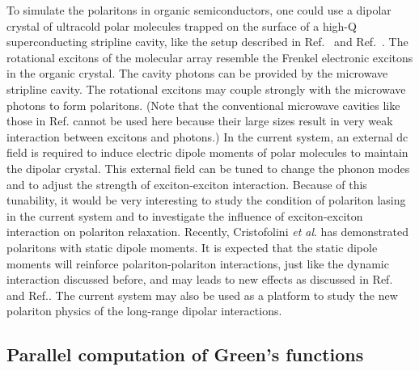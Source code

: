 To simulate the polaritons in organic semiconductors, one could use a dipolar crystal of ultracold polar molecules 
 trapped on the surface of a high-Q superconducting stripline cavity, like the setup described in 
Ref.~\cite{peter-rabl} and Ref.~\cite{peter-rabl2}.
The rotational excitons of the molecular array resemble the Frenkel electronic excitons in the 
 organic crystal. The cavity photons can be provided by the microwave stripline cavity. 
The rotational excitons may couple strongly with the microwave photons to form polaritons. 
(Note that the conventional 
microwave cavities like those in Ref. \cite{raimond2001} cannot be used here because their large sizes result in very 
weak interaction between excitons and photons.) 
In the current system,  an external dc field is required to induce electric dipole moments of polar molecules to 
maintain the dipolar crystal. This external field can be tuned to change the phonon modes and to adjust the strength
of exciton-exciton interaction. Because of this tunability, it would be very interesting to study the condition of 
polariton lasing in the current system and to investigate the influence of exciton-exciton interaction 
 on polariton relaxation. 
Recently, Cristofolini \textit{et al}. has demonstrated polaritons with static dipole moments\cite{cristofolini2012}. 
It is expected that the static dipole moments will reinforce polariton-polariton interactions, just like the dynamic 
interaction discussed before, and may leads to new effects as discussed in Ref.\cite{astrakharchik2007} and 
Ref.\cite{boning2011}.  The current system may also be used as a platform to study the new polariton physics of
the long-range dipolar interactions. 
  


\subsection{Parallel computation of Green's functions}

